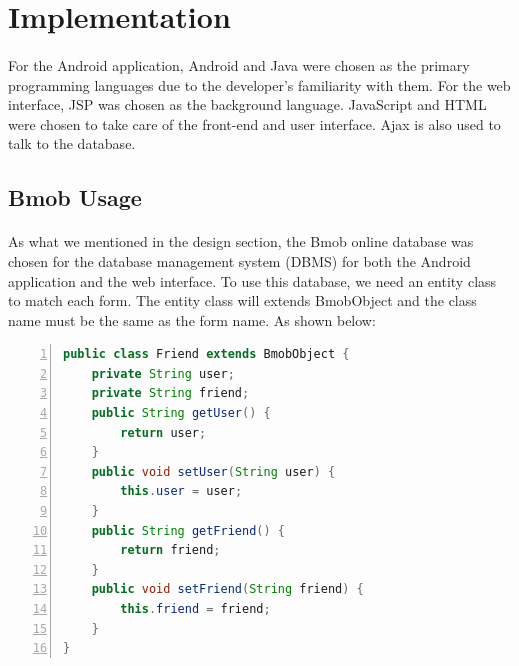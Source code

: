 \section{Implementation}												
\label{sec:Implementation}

\paragraph{}For the Android application, Android and Java were chosen as the primary programming languages due to the developer's familiarity with them. For the web interface, JSP was chosen as the background language. JavaScript and HTML were chosen to take care of the front-end and user interface. Ajax is also used to talk to the database. 

\subsection{Bmob Usage}
\label{subsec:DatabaseOperations}
\paragraph{}As what we mentioned in the design section, the Bmob online database was chosen for the database management system (DBMS) for both the Android application and the web interface. To use this database, we need an entity class to match each form. The entity class will extends {\ttfamily BmobObject} and the class name must be the same as the form name. As shown below:

\begin{center}
\begin{lstlisting}[language={java},
        numbers=left,basicstyle=\footnotesize\ttfamily,xleftmargin=.2\textwidth, xrightmargin=.2\textwidth]
public class Friend extends BmobObject {
    private String user;
    private String friend;
    public String getUser() {
        return user;
    }
    public void setUser(String user) {
        this.user = user;
    }
    public String getFriend() {
        return friend;
    }
    public void setFriend(String friend) {
        this.friend = friend;
    }
}
\end{lstlisting} 
\end{center}


